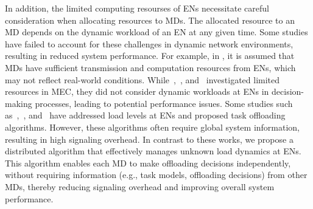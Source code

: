 \documentclass[12pt,draftclsnofoot,onecolumn]{IEEEtran}
\begin{document}
	
	
	
	
	
	In addition, the limited computing resourses of ENs necessitate careful consideration when allocating resources to MDs. The allocated resource to an MD depends on the dynamic workload of an EN at any given time. Some studies have failed to account for these challenges in dynamic network environments, resulting in reduced system performance. For example, in \cite{chen2021drl}, it is assumed that MDs have sufficient transmission and computation resources from ENs, which may not reflect real-world conditions. While~\cite{dai2020edge},~\cite{wu2024privacy}, and~\cite{zhao2019deep} investigated limited resources in MEC, they did not consider dynamic workloads at ENs in decision-making processes, leading to potential performance issues.
	Some studies such as~\cite{sun2024hierarchical},~\cite{gong2022edge}, and~\cite{gao2022large} have addressed load levels at ENs and proposed task offloading algorithms. However, these algorithms often require global system information, resulting in high signaling overhead. In contrast to these works, we propose a distributed algorithm that effectively manages unknown load dynamics at ENs. This algorithm enables each MD to make offloading decisions independently, without requiring information (e.g., task models, offloading decisions) from other MDs, thereby reducing signaling overhead and improving overall system performance.
	
	
	
	
	
\end{document}
